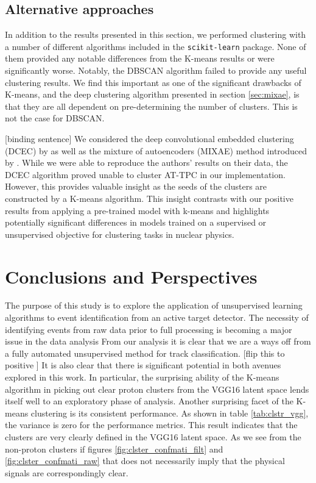 \documentclass[review,number,sort&compress]{elsarticle}
\begin{document}
\subsection{Alternative approaches}

In addition to the results presented in this section, we performed clustering with a number of different algorithms included in the \lstinline{scikit-learn} package. None of them provided any notable differences from the K-means results or were significantly worse. Notably, the DBSCAN algorithm \cite{Ester96adensity-based}\cite{Bergstra2012} failed to provide any useful clustering results. We find this important as one of the significant drawbacks of K-means, and the deep clustering algorithm presented in section \ref{sec:mixae}, is that they are all dependent on pre-determining the number of clusters. This is not the case for DBSCAN. 

{\color{orange}[binding sentence]}
We considered the deep convolutional embedded clustering (DCEC) by \citet{Guo2017} as well as the mixture of autoencoders (MIXAE) method introduced by \citet{Zhang}. While we were able to reproduce the authors' results on their data, the DCEC algorithm proved unable to cluster AT-TPC in our implementation. However, this provides valuable insight as the seeds of the clusters are constructed by a K-means algorithm. This insight contrasts with our positive results from applying a pre-trained model with k-means and highlights potentially significant differences in models trained on a supervised or unsupervised objective for clustering tasks in nuclear physics. 


\section{Conclusions and Perspectives}\label{sec{conclusion}}
The purpose of this study is to explore the application of unsupervised learning algorithms to event identification from an active target detector. The necessity of identifying events from raw data prior to full processing is becoming a major issue in the data analysis 
From our analysis it is clear that we are a ways off from a fully automated unsupervised method for track classification. {\color{orange}[flip this to positive ]} It is also clear that there is significant potential in both avenues explored in this work. 
In particular, the surprising ability of the K-means algorithm in picking out clear proton clusters from the VGG16 latent space lends itself well to an exploratory phase of analysis.
Another surprising facet of the K-means clustering is its consistent performance. As shown in table \ref{tab:clstr_vgg}, the variance is zero for the performance metrics. This result indicates that the clusters are very clearly defined in the VGG16 latent space. As we see from the non-proton clusters if figures \ref{fig:clster_confmati_filt} and \ref{fig:clster_confmati_raw}  that does not necessarily imply that the physical signals are correspondingly clear. 
\end{document}
